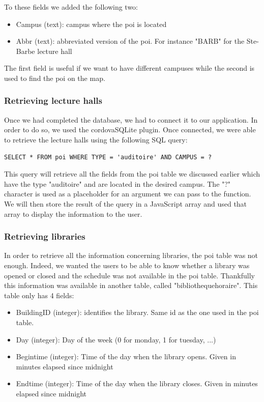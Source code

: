 \documentclass{eplmastersthesis}
\begin{document}
To these fields we added the following two:
\begin{itemize}
\item Campus (text): campus where the poi is located
\item Abbr (text): abbreviated version of the poi. For instance "BARB" for the Ste-Barbe lecture hall
\end{itemize}

The first field is useful if we want to have different campuses while the second is used to find the poi on the map.

\subsubsection{Retrieving lecture halls}

Once we had completed the database, we had to connect it to our application. In order to do so, we used the cordovaSQLite plugin. Once connected, we were able to retrieve the lecture halls using the following SQL query: 
\begin{verbatim}
SELECT * FROM poi WHERE TYPE = 'auditoire' AND CAMPUS = ?
\end{verbatim}

This query will retrieve all the fields from the poi table we discussed earlier which have the type "auditoire" and are located in the desired campus. The "?" character is used as a placeholder for an argument we can pass to the function. We will then store the result of the query in a JavaScript array and used that array to display the information to the user.

\subsubsection{Retrieving libraries}

In order to retrieve all the information concerning libraries, the poi table was not enough. Indeed, we wanted the users to be able to know whether a library was opened or closed and the schedule was not available in the poi table. Thankfully this information was available in another table, called "bibliotheque\textunderscore horaire". This table only has 4 fields:

\begin{itemize}
\item Building\textunderscore ID (integer): identifies the library. Same id as the one used in the poi table.
\item Day (integer): Day of the week (0 for monday, 1 for tuesday, ...)
\item Begin\textunderscore time (integer): Time of the day when the library opens. Given in minutes elapsed since midnight
\item End\textunderscore time (integer): Time of the day when the library closes. Given in minutes elapsed since midnight
\end{itemize}
\end{document}
